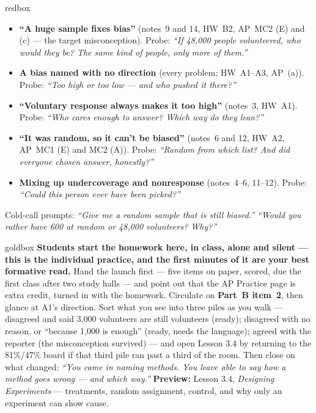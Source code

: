 \documentclass[10pt]{article}
\begin{document}
\boxguard
\begin{skillbox}{redbox}
\begin{itemize}[leftmargin=1.2em, nosep]
  \item \textbf{``A huge sample fixes bias''} (notes~9 and 14, HW~B2, AP~MC2 (E) and (c) --- the
        target misconception). Probe: \emph{``If 48{,}000 people volunteered, who would they
        be? The same kind of people, only more of them.''}
  \item \textbf{A bias named with no direction} (every problem; HW~A1--A3, AP~(a)). Probe:
        \emph{``Too high or too low --- and who pushed it there?''}
  \item \textbf{``Voluntary response always makes it too high''} (notes~3, HW~A1). Probe:
        \emph{``Who cares enough to answer? Which way do \emph{they} lean?''}
  \item \textbf{``It was random, so it can't be biased''} (notes~6 and 12, HW~A2, AP~MC1 (E)
        and MC2 (A)). Probe: \emph{``Random from which list? And did everyone chosen answer,
        honestly?''}
  \item \textbf{Mixing up undercoverage and nonresponse} (notes~4--6, 11--12). Probe:
        \emph{``Could this person ever have been picked?''}
\end{itemize}
Cold-call prompts: \emph{``Give me a random sample that is still biased.''} \quad
\emph{``Would you rather have 600 at random or 48{,}000 volunteers? Why?''}
\end{skillbox}

\boxguard
\begin{skillbox}{goldbox}
\textbf{Students start the homework here, in class, alone and silent --- this is the individual
practice, and the first minutes of it are your best formative read.} Hand the launch first ---
five items on paper, scored, due the first class after two study halls --- and point out that
the AP Practice page is extra credit, turned in with the homework. Circulate on \textbf{Part~B
item~2}, then glance at A1's direction. Sort what you see into three piles as you walk ---
disagreed and said 3{,}000 volunteers are still volunteers (ready); disagreed with no reason,
or ``because 1{,}000 is enough'' (ready, needs the language); agreed with the reporter (the
misconception survived) --- and open Lesson 3.4 by returning to the 81\%/47\% board if that
third pile ran past a third of the room. Then close on what changed: \emph{``You came in
naming methods. You leave able to say how a method goes wrong --- and which way.''}
\textbf{Preview:} Lesson 3.4, \emph{Designing Experiments} --- treatments, random assignment,
control, and why only an experiment can show cause.
\end{skillbox}
\end{document}
